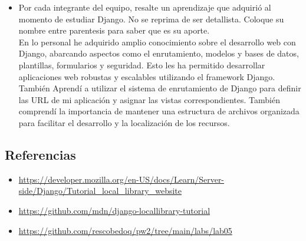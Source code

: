 \documentclass[12]{article}
\begin{document}
	\begin{itemize}
		\item Por cada integrante del equipo, resalte un aprendizaje que adquirió al momento de estudiar Django. No se reprima de ser detallista. Coloque su nombre entre parentesis para saber que es su aporte.\\
		
		En lo personal he adquirido amplio conocimiento sobre el desarrollo web con Django, abarcando aspectos como el enrutamiento, modelos y bases de datos, plantillas, formularios y seguridad. Esto les ha permitido desarrollar aplicaciones web robustas y escalables utilizando el framework Django.
		También Aprendí a utilizar el sistema de enrutamiento de Django para definir las URL de mi aplicación y asignar las vistas correspondientes. También comprendí la importancia de mantener una estructura de archivos organizada para facilitar el desarrollo y la localización de los recursos.
	\end{itemize}\newpage
	
	\subsection*{Referencias}
	
	\begin{itemize}
		\item \url{https://developer.mozilla.org/en-US/docs/Learn/Server-side/Django/Tutorial_local_library_website}
		\item \url{https://github.com/mdn/django-locallibrary-tutorial}
		\item \url{https://github.com/rescobedoq/pw2/tree/main/labs/lab05}
	\end{itemize}
	
\end{document}
